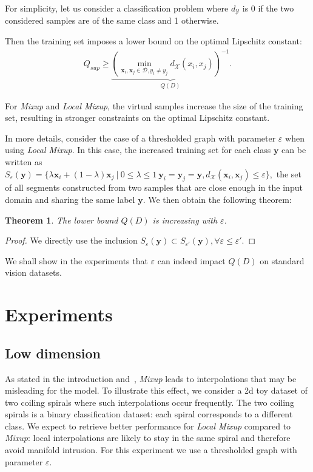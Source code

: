 \documentclass[twoside]{article}
\newtheorem{theorem}{Theorem}[section]
\numberwithin{intassumption}{assumption}
\begin{document}
For simplicity, let us consider a classification problem where $d_\mathcal{Y}$ is 0 if the two considered samples are of the same class and 1 otherwise.

Then the training set imposes a lower bound on the optimal Lipschitz constant:
\begin{align}
    Q_{sup} \geq \underbrace{\left(\min_{\mathbf{x}_i,\mathbf{x}_j \in \mathcal{D}, y_i \neq y_j} d_\mathcal{X}(x_i,x_j) \right)^{-1}}_{Q(D)}.
\end{align}

For \emph{Mixup} and \emph{Local Mixup}, the virtual samples increase the size of the training set, resulting in stronger constraints on the optimal Lipschitz constant.

In more details, consider the case of a thresholded graph with parameter $\varepsilon$ when using \emph{Local Mixup}. In this case, the increased training set for each class $\mathbf{y}$ can be written as $S_\varepsilon(\mathbf{y}) = \{ \lambda \mathbf{x}_i + (1-\lambda) \mathbf{x}_j \ \vert \  0\leq \lambda\leq 1 \ \mathbf{y}_i = \mathbf{y}_j = \mathbf{y}, d_{\mathcal{X}}(\mathbf{x}_i, \mathbf{x}_j) \leq \varepsilon  \},$ the set of all segments constructed from two samples that are close enough in the input domain and sharing the same label $\mathbf{y}$. We then obtain the following theorem:

\begin{theorem}\label{theoremLip}
    The lower bound $Q(D)$ is increasing with $\varepsilon$.
\end{theorem}
\begin{proof}
We directly use the inclusion $S_\varepsilon(\mathbf{y})\subset S_{\varepsilon'}(\mathbf{y}), \forall \varepsilon \leq \varepsilon'$.
\end{proof}

We shall show in the experiments that $\varepsilon$ can indeed impact $Q(D)$ on standard vision datasets.

\section{Experiments}
\subsection{Low dimension}
As stated in the introduction and~\citep{guo2019mixup}, \emph{Mixup} leads to interpolations that may be misleading for the model. To illustrate this effect, we consider a 2d toy dataset of two coiling spirals where such interpolations occur frequently. The two coiling spirals is a binary classification dataset: each spiral corresponds to a different class. We expect to retrieve better performance for \emph{Local Mixup} compared to \emph{Mixup}: local interpolations are likely to stay in the same spiral and therefore avoid manifold intrusion. For this experiment we use a thresholded graph with parameter $\varepsilon$.
\end{document}
